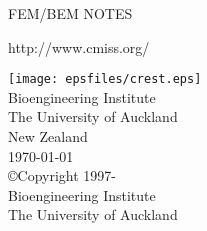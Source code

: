 \thispagestyle{empty}

\begin{center}
   \huge FEM/BEM NOTES
   \vspace{10mm}   

   \large http://www.cmiss.org/

   \vspace{40mm}   

   \large
   \vspace{20mm}
      \texttt{[image: epsfiles/crest.eps]}\\
   \vspace{15mm}      
      Bioengineering Institute \\ 
      The University of Auckland \\ 
      New Zealand \\

   \vspace{5mm}
   \today\\   %
   \vspace{20mm}
   \small
   \copyright \thickspace Copyright 1997-\\
   Bioengineering Institute\\
   The University of Auckland
\end{center}





